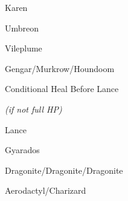 \begin{paracol}{2}
\begin{boss}{Karen}
	\varwb
	\begin{fightSection}{Umbreon}
		\item \xSpecial
		\item {}
		\item {}
		\item {} \surf{} 
	\end{fightSection}
	\begin{fightSection}{Vileplume}
		\item {} \icePunch
	\end{fightSection}
	\begin{fightSection}{Gengar/Murkrow/Houndoom}
		\item {} \surf{} 
	\end{fightSection}
	\varwe
\end{boss}

\switchcolumn*
\vspace{-2.1cm}
\begin{menu}{Conditional Heal Before Lance}
	\varwb
	\begin{packMenu}
		\item \fullRestore{} \textit{(if not full HP)}
	\end{packMenu}
	\varwe
\end{menu}

\switchcolumn
\begin{boss}{Lance}
	\varwb
	\begin{fightSection}{Gyarados}
		\item {} \return
		\item {}
		\item {} \strength
	\end{fightSection}
	\begin{fightSection}{Dragonite/Dragonite/Dragonite}
		\item {} \icePunch{} 
	\end{fightSection}
	\begin{fightSection}{Aerodactyl/Charizard}
		\item {} \surf{} 
	\end{fightSection}
	\varwe
\end{boss}

\end{paracol}
\vspace{3.5mm}